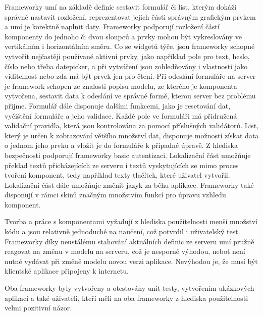 Frameworky umí na základě definic sestavit formulář či list, kterým dokáží správně nastavit rozložení, reprezentovat jejich části správným grafickým prvkem a umí je korektně naplnit daty. Frameworky podporují rozložení částí komponenty do jednoho či dvou sloupců a prvky mohou být vykreslovány ve vertikálním i horizontálním směru. Co se widgetů týče, jsou frameworky schopné vytvořit nejčastěji používané aktivní prvky, jako například pole pro text, heslo, číslo nebo třeba datepicker, a při vytváření jsou zohledňovány i vlastnosti jako viditelnost nebo zda má být prvek jen pro čtení. Při odeslání formuláře na server je framework schopen ze znalosti popisu modelu, ze kterého je komponenta vytvořena, sestavit data k odeslání ve správné formě, kterou server bez problému přijme. Formulář dále disponuje dalšími funkcemi, jako je resetování dat, vyčištění formuláře a jeho validace. Každé pole ve formuláři má přidružená validační pravidla, která jsou kontrolována za pomocí příslušných validátorů. List, který je určen k zobrazování většího množství dat, disponuje možností získat data o jednom jeho prvku a vložit je do formuláře k případné úpravě. Z hlediska bezpečnosti podporují frameworky basic autentizaci. Lokalizační část umožňuje překlad textů přicházejících ze serveru i textů vyskytujících se mimo proces tvoření komponent, tedy například texty tlačítek, které uživatel vytvořil. Lokalizační část dále umožňuje změnit jazyk za běhu aplikace. Frameworky také disponují v rámci skinů značným množstvím funkcí pro úpravu vzhledu komponent.

Tvorba a práce s komponentami vyžadují z hlediska použitelnosti menší množství kódu a jsou relativně jednoduché na naučení, což potvrdil i uživatelský test. Frameworky díky neustálému stahování aktuálních definic ze serveru umí pružně reagovat na změnu v modelu na serveru, což je nesporně výhodou, neboť není nutné vydávat při změně modelu novou verzi aplikace. Nevýhodou je, že musí být klientské aplikace připojeny k internetu.

Oba frameworky byly vytvořeny a otestovány unit testy, vytvořením ukázkových aplikací a také uživateli, kteří měli na oba frameworky z hlediska použitelnosti velmi pozitivní názor.